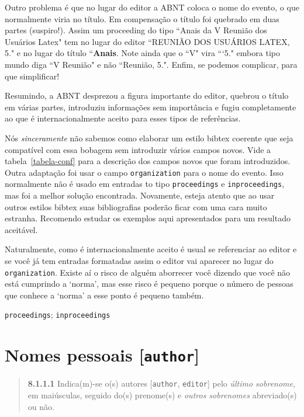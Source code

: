 \documentclass[espacosimples]{abnt}
\begin{document}
Outro problema é que no lugar do editor a ABNT coloca o nome do evento, o que
normalmente viria no título. Em compensação o título foi quebrado em duas partes
(suspiro!). Assim um proceeding do tipo ``Anais da V Reunião dos Usuários Latex"
tem no lugar do editor ``REUNIÃO DOS USUÁRIOS LATEX, 5." e no lugar
do título ``{\bf Anais}. Note ainda que o ``V" vira ```5." embora
tipo mundo diga ``V Reunião" e não ``Reunião, 5.".
Enfim, se podemos complicar, para que simplificar!

Resumindo, a ABNT desprezou a figura importante do editor, quebrou o título
em várias partes, introduziu informações sem importância e fugiu completamente
ao que é internacionalmente aceito para esses tipos de referências.

Nós \emph{sinceramente} não sabemos como elaborar um estilo bibtex coerente que seja
compatível com essa bobagem sem introduzir vários campos novos.
Vide a tabela~\ref{tabela-conf} para a descrição dos campos novos que
foram introduzidos.
Outra adaptação foi usar o campo {\tt organization} para
o nome do evento. Isso normalmente não é usado em entradas to tipo
{\tt proceedings} e {\tt inproceedings}, mas foi a melhor solução encontrada.
Novamente, esteja atento que ao usar outros estilos bibtex suas bibliografias
poderão ficar com uma cara muito estranha. Recomendo estudar os exemplos
aqui apresentados para um resultado aceitável.

Naturalmente, como é internacionalmente aceito é usual se referenciar ao
editor e se você já tem entradas formatadas assim o editor vai aparecer
no lugar do {\tt organization}. Existe aí o risco de alguém aborrecer você
dizendo que você não está cumprindo a `norma', mas esse risco é pequeno
porque o número de pessoas que conhece a `norma' a esse ponto é
pequeno também.

{\tt proceedings}\cite{7.5.1.2-1,7.5.1.2-2,7.5.1.2-3,7.5.3-1,8.1.2.1-3};
{\tt inproceedings}\cite{7.5.2.2-1,7.5.2.2-2,7.5.2.2-3,7.5.3-2,7.5.3-3,7.5.3-4,7.5.3-5}

\section{Nomes pessoais [{\tt author}]}
\label{nome-pessoais}
\begin{quote}
{\bf 8.1.1.1}\cite{NBR6023:2000}
Indica(m)-se o(s) autores [{\tt author}, {\tt editor}]
pelo \emph{último sobrenome}, em maiúsculas, seguido
do(s) prenome(s) e \emph{outros sobrenomes} abreviado(s) ou não.
\cite{8.1.1.1-1,8.1.1.1-2}
\cite{8.1.1.1-1,8.1.1.1-2,8.1.1.1-3}
\end{quote}
\end{document}
